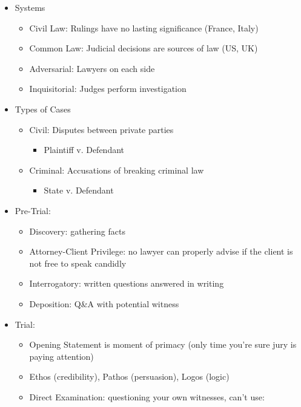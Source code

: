 \documentclass[
]{article}
\providecommand{\tightlist}{%
  \setlength{\itemsep}{0pt}\setlength{\parskip}{0pt}}
\begin{document}
\begin{itemize}
\item
  Systems

  \begin{itemize}
  \item
    Civil Law: Rulings have no lasting significance (France, Italy)
  \item
    Common Law: Judicial decisions are sources of law (US, UK)
  \item
    Adversarial: Lawyers on each side
  \item
    Inquisitorial: Judges perform investigation
  \end{itemize}
\item
  Types of Cases

  \begin{itemize}
  \item
    Civil: Disputes between private parties

    \begin{itemize}
    \tightlist
    \item
      Plaintiff v. Defendant
    \end{itemize}
  \item
    Criminal: Accusations of breaking criminal law

    \begin{itemize}
    \tightlist
    \item
      State v. Defendant
    \end{itemize}
  \end{itemize}
\item
  Pre-Trial:

  \begin{itemize}
  \item
    Discovery: gathering facts
  \item
    Attorney-Client Privilege: no lawyer can properly advise if the
    client is not free to speak candidly
  \item
    Interrogatory: written questions answered in writing
  \item
    Deposition: Q\&A with potential witness
  \end{itemize}
\item
  Trial:

  \begin{itemize}
  \item
    Opening Statement is moment of primacy (only time you're sure jury
    is paying attention)
  \item
    Ethos (credibility), Pathos (persuasion), Logos (logic)
  \item
    Direct Examination: questioning your own witnesses, can't use:


\end{itemize}
\end{itemize}
\end{document}
